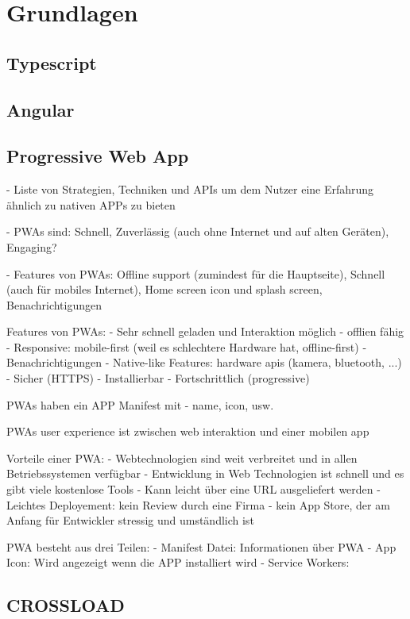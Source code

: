 \chapter{Grundlagen}
\label{Kap2}

\section{Typescript}

\section{Angular}

\section{Progressive Web App}
- Liste von Strategien, Techniken und APIs um dem Nutzer eine Erfahrung ähnlich zu nativen APPs zu bieten \autocite{Sheppard2017}

- PWAs sind: Schnell, Zuverlässig (auch ohne Internet und auf alten Geräten), Engaging? \autocite{Sheppard2017} \autocite{Hajian2019}

- Features von PWAs: Offline support (zumindest für die Hauptseite), Schnell (auch für mobiles Internet), Home screen icon und splash screen, Benachrichtigungen \autocite{Sheppard2017}

Features von PWAs:
- Sehr schnell geladen und Interaktion möglich
- offlien fähig
- Responsive: mobile-first (weil es schlechtere Hardware hat, offline-first)
- Benachrichtigungen
- Native-like Features: hardware apis (kamera, bluetooth, ...)
- Sicher (HTTPS)
- Installierbar
- Fortschrittlich (progressive)
\autocite{Hajian2019}

PWAs haben ein APP Manifest mit
- name, icon, usw.
\autocite{Hajian2019}

PWAs user experience ist zwischen web interaktion und einer mobilen app
\autocite{Rojas2020}

Vorteile einer PWA:
- Webtechnologien sind weit verbreitet und in allen Betriebssystemen verfügbar
- Entwicklung in Web Technologien ist schnell und es gibt viele kostenlose Tools
- Kann leicht über eine URL ausgeliefert werden
- Leichtes Deployement: kein Review durch eine Firma
- kein App Store, der am Anfang für Entwickler stressig und umständlich ist
\autocite{Rojas2020}

PWA besteht aus drei Teilen:
- Manifest Datei: Informationen über PWA
- App Icon: Wird angezeigt wenn die APP installiert wird
- Service Workers: 
\autocite{Rojas2020}

\section{CROSSLOAD}
